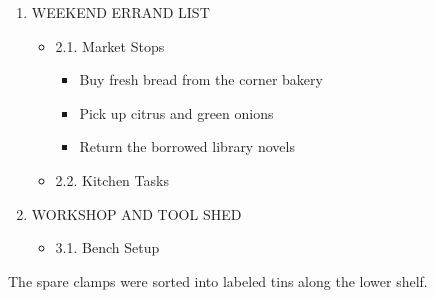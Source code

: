 \documentclass[11pt,a4paper]{article}
\begin{document}
\begin{enumerate}
\item WEEKEND ERRAND LIST
  \begin{itemize}
\item 2.1. Market Stops
    \begin{itemize}
\item Buy fresh bread from the corner bakery
\item Pick up citrus and green onions
\item Return the borrowed library novels
    \end{itemize}
\item 2.2. Kitchen Tasks
  \end{itemize}
\item WORKSHOP AND TOOL SHED
  \begin{itemize}
\item 3.1. Bench Setup
  \end{itemize}
\end{enumerate}

The spare clamps were sorted into labeled tins along the lower shelf.
\end{document}
